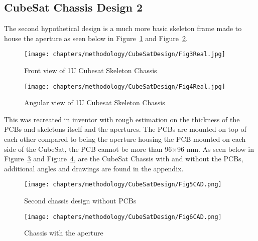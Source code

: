 \subsection{CubeSat Chassis Design 2}
The second hypothetical design is a much more basic skeleton frame made to house the aperture as seen below in Figure~\ref{fig:cubesat-chassis2-front} and Figure~\ref{fig:cubesat-chassis2-angle}.

\begin{figure}[htbp]
\centering
\texttt{[image: chapters/methodology/CubeSatDesign/Fig3Real.jpg]}
\caption{Front view of 1U Cubesat Skeleton Chassis \cite{satsearch2021cubesat}}
\label{fig:cubesat-chassis2-front}
\end{figure}

\begin{figure}[htbp]
\centering
\texttt{[image: chapters/methodology/CubeSatDesign/Fig4Real.jpg]}
\caption{Angular view of 1U Cubesat Skeleton Chassis \cite{satsearch2021cubesat}}
\label{fig:cubesat-chassis2-angle}
\end{figure}

This was recreated in inventor with rough estimation on the thickness of the PCBs and skeletons itself and the apertures. 
The PCBs are mounted on top of each other compared to being the aperture housing the PCB mounted on each side of the CubeSat, the PCB cannot be more than 96$\times$96 mm. 
As seen below in Figure~\ref{fig:cubesat-chassis2-without-pcb} and Figure~\ref{fig:cubesat-chassis2-with-aperture}, are the CubeSat Chassis with and without the PCBs, additional angles and drawings are found in the appendix.
\begin{figure}[htbp]
\centering
\texttt{[image: chapters/methodology/CubeSatDesign/Fig5CAD.png]}
\caption{Second chassis design without PCBs}
\label{fig:cubesat-chassis2-without-pcb}
\end{figure}

\begin{figure}[htbp]
\centering
\texttt{[image: chapters/methodology/CubeSatDesign/Fig6CAD.png]}
\caption{Chassis with the aperture}
\label{fig:cubesat-chassis2-with-aperture}
\end{figure}
